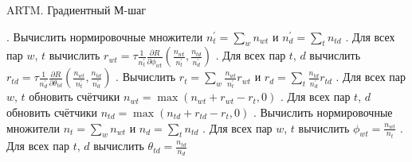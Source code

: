 \documentclass[12pt]{article}
\begin{document}
\begin{algorithm}
\caption{ARTM. Градиентный М-шаг}\label{malgo3}
\begin{algorithmic}[]
. Вычислить нормировочные множители $n^{\prime}_t = \sum_w n_{wt}$ и $n^{\prime}_d = \sum_t n_{td}$
. Для всех пар $w$, $t$ вычислить $r_{wt}= \tau \frac{1}{n^{\prime}_t} \frac{\partial{R}}{\partial{\phi_{wt}}}(\frac{n_{wt}}{n^{\prime}_t}, \frac{n_{td}}{n^{\prime}_d})$
. Для всех пар $t$, $d$ вычислить $r_{td}= \tau \frac{1}{n^{\prime}_d} \frac{\partial{R}}{\partial{\theta_{td}}}(\frac{n_{wt}}{n^{\prime}_t}, \frac{n_{td}}{n^{\prime}_d})$
. Вычислить $r_t = \sum_w \frac{n_{wt}}{n^{\prime}_t} r_{wt}$ и $r_d = \sum_t \frac{n_{td}}{n^{\prime}_d} r_{td}$
. Для всех пар $w$, $t$ обновить счётчики $n_{wt} = \max(n_{wt} + r_{wt} - r_t, 0)$
. Для всех пар $t$, $d$ обновить счётчики $n_{td} = \max(n_{td} + r_{td} - r_t, 0)$
. Вычислить нормировочные множители $n_t = \sum_w n_{wt}$ и $n_d = \sum_t n_{td}$
. Для всех пар $w$, $t$ вычислить $\phi_{wt} = \frac{n_{wt}}{n_t}$
. Для всех пар $t$, $d$ вычислить $\theta_{td} = \frac{n_{td}}{n_d}$
\EndProcedure
\end{algorithmic}
\end{algorithm}\ \\

	
\end{document}
